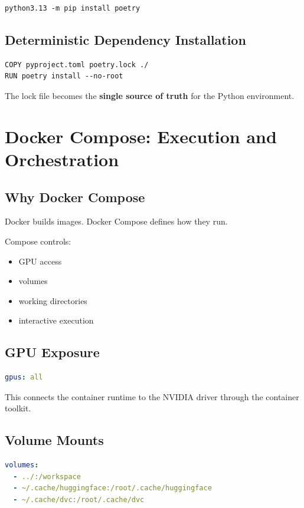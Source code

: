 \documentclass[11pt, a4paper]{article}
\begin{document}
\begin{lstlisting}[language=docker]
python3.13 -m pip install poetry
\end{lstlisting}

\subsection{Deterministic Dependency Installation}
\begin{lstlisting}[language=docker]
COPY pyproject.toml poetry.lock ./
RUN poetry install --no-root
\end{lstlisting}

The lock file becomes the \textbf{single source of truth} for the Python environment.

\section{Docker Compose: Execution and Orchestration}

\subsection{Why Docker Compose}
Docker builds images.
Docker Compose defines how they run.

Compose controls:
\begin{itemize}
    \item GPU access
    \item volumes
    \item working directories
    \item interactive execution
\end{itemize}

\subsection{GPU Exposure}
\begin{lstlisting}[language=yaml]
gpus: all
\end{lstlisting}

This connects the container runtime to the NVIDIA driver through the container toolkit.

\subsection{Volume Mounts}
\begin{lstlisting}[language=yaml]
volumes:
  - ../:/workspace
  - ~/.cache/huggingface:/root/.cache/huggingface
  - ~/.cache/dvc:/root/.cache/dvc
\end{lstlisting}
\end{document}
